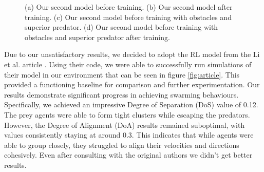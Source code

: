 \documentclass[9pt]{pnas-new}
\begin{document}
\begin{figure}[ht]
	\caption{(a) Our second model before training. (b) Our second model after training. (c) Our second model before training with obstacles and superior predator. (d) Our second model before training with obstacles and superior predator after training. }
	\label{fig:second}
\end{figure}

Due to our unsatisfactory results, we decided to adopt the RL model from the Li et al. article \cite{li2023predator}.
Using their code, we were able to successfully run simulations of their model in our environment that can be seen in figure \ref{fig:article}. 
This provided a functioning baseline for comparison and further experimentation.
Our results demonstrate significant progress in achieving swarming behaviours. 
Specifically, we achieved an impressive Degree of Separation (DoS) value of 0.12.
The prey agents were able to form tight clusters while escaping the predators.
However, the Degree of Alignment (DoA) results remained suboptimal, with values consistently staying at around 0.3.
This indicates that while agents were able to group closely, they struggled to align their velocities and directions cohesively. 
Even after consulting with the original authors we didn't get better results.
\end{document}
